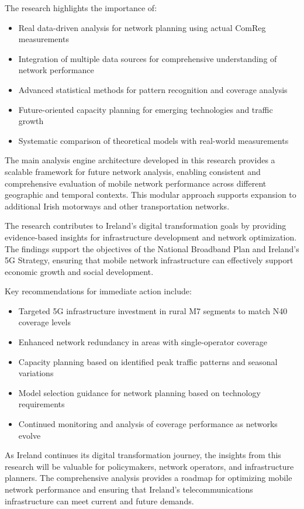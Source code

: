 \documentclass[MScCS]{uccthesis}
\begin{document}
The research highlights the importance of:
\begin{itemize}
\item Real data-driven analysis for network planning using actual ComReg measurements
\item Integration of multiple data sources for comprehensive understanding of network performance
\item Advanced statistical methods for pattern recognition and coverage analysis
\item Future-oriented capacity planning for emerging technologies and traffic growth
\item Systematic comparison of theoretical models with real-world measurements
\end{itemize}

The main analysis engine architecture developed in this research provides a scalable framework for future network analysis, enabling consistent and comprehensive evaluation of mobile network performance across different geographic and temporal contexts. This modular approach supports expansion to additional Irish motorways and other transportation networks.

The research contributes to Ireland's digital transformation goals by providing evidence-based insights for infrastructure development and network optimization. The findings support the objectives of the National Broadband Plan and Ireland's 5G Strategy, ensuring that mobile network infrastructure can effectively support economic growth and social development.

Key recommendations for immediate action include:
\begin{itemize}
\item Targeted 5G infrastructure investment in rural M7 segments to match N40 coverage levels
\item Enhanced network redundancy in areas with single-operator coverage
\item Capacity planning based on identified peak traffic patterns and seasonal variations
\item Model selection guidance for network planning based on technology requirements
\item Continued monitoring and analysis of coverage performance as networks evolve
\end{itemize}

As Ireland continues its digital transformation journey, the insights from this research will be valuable for policymakers, network operators, and infrastructure planners. The comprehensive analysis provides a roadmap for optimizing mobile network performance and ensuring that Ireland's telecommunications infrastructure can meet current and future demands.
\end{document}
